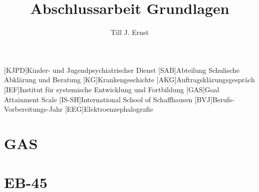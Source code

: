 


\title{Abschlussarbeit Grundlagen}
\author{Till J. Ernst}






\tableofcontents
\newpage

\begin{acronym}[KJPD]
[KJPD]{Kinder- und Jugendpsychiatrischer Dienst}
[SAB]{Abteilung Schulische Abklärung und Beratung}
[KG]{Krankengeschichte}
[AKG]{Auftragsklärungsgespräch}
[IEF]{Institut für systemische Entwicklung und Fortbildung}
[GAS]{Goal Attainment Scale}
[IS-SH]{International School of Schaffhausen}
[BVJ]{Berufs-Vorbereitungs-Jahr}
[EEG]{Elektroenzephalografie}
\end{acronym}
\newpage













\renewcommand{\appendixtocname}{Anhang}
\renewcommand{\appendixname}{Anhang}
\renewcommand{\appendixpagename}{Anhang}

\newpage
\appendixpage
\addappheadtotoc
\section{GAS} \label{app:gas}
\section{EB-45} \label{app:eb45}


\newpage
\begin{flushleft}
{}
\end{flushleft}


%
%
%